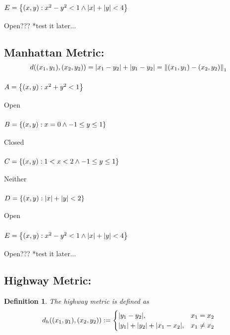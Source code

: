 \documentclass[]{article}
\newtheorem{definition}{Definition}
\begin{document}
\subsubsection{$E = \qty{(x,y) : x^2 - y^2 < 1 \land \abs{x} + \abs{y} < 4}$}
Open??? *test it later...

\subsection{Manhattan Metric: 
$$d((x_1,y_1),(x_2,y_2)) = \abs{x_1-y_2} + \abs{y_1-y_2} = \norm{(x_1,y_1)-(x_2,y_2)}_1$$
}
\subsubsection{$A = \qty{(x,y) : x^2 + y^2 < 1}$}
Open
\subsubsection{$B = \qty{(x,y) : x = 0 \land -1 \leq y \leq 1}$}
Closed
\subsubsection{$C = \qty{(x,y) : 1 < x < 2 \land -1 \leq y \leq 1}$}
Neither
\subsubsection{$D = \qty{(x,y) : \abs{x} + \abs{y} < 2}$}
Open
\subsubsection{$E = \qty{(x,y) : x^2 - y^2 < 1 \land \abs{x} + \abs{y} < 4}$}
Open??? *test it later...


\subsection{Highway Metric:}
\begin{definition}
    The highway metric is defined as 
    \begin{displaymath}
        d_h((x_1,y_1),(x_2,y_2)) := 
        \begin{cases}
            \abs{y_1 - y_2}, &x_1 = x_2\\
            \abs{y_1} + \abs{y_2} + \abs{x_1 - x_2}, &x_1 \neq x_2
        \end{cases}
    \end{displaymath}
\end{definition}
\end{document}
